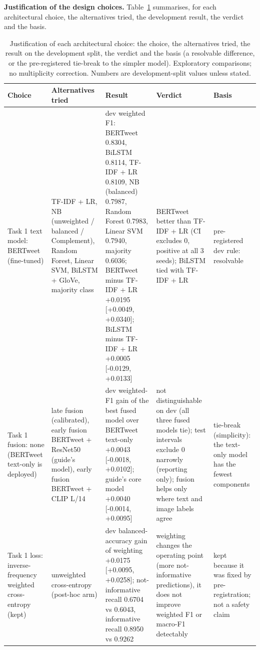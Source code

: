 \documentclass[conference]{IEEEtran}
\begin{document}
\textbf{Justification of the design choices.} Table~\ref{tab:justify} summarises, for each architectural choice, the alternatives tried, the development result, the verdict and the basis.

\begin{table}[t]
\centering
\caption{Justification of each architectural choice: the choice, the alternatives tried, the result on the development split, the verdict and the basis (a resolvable difference, or the pre-registered tie-break to the simpler model). Exploratory comparisons; no multiplicity correction. Numbers are development-split values unless stated.}
\label{tab:justify}
\tiny
\setlength{\tabcolsep}{2.5pt}
\begin{tabular}{p{2.2cm}p{3.1cm}p{5.6cm}p{3.2cm}p{2.6cm}}
\toprule
Choice & Alternatives tried & Result & Verdict & Basis \\
\midrule
Task 1 text model: BERTweet (fine-tuned) & TF-IDF + LR, NB (unweighted / balanced / Complement), Random Forest, Linear SVM, BiLSTM + GloVe, majority class & dev weighted F1: BERTweet 0.8304, BiLSTM 0.8114, TF-IDF + LR 0.8109, NB (balanced) 0.7987, Random Forest 0.7983, Linear SVM 0.7940, majority 0.6036; BERTweet minus TF-IDF + LR +0.0195 [+0.0049, +0.0340]; BiLSTM minus TF-IDF + LR +0.0005 [-0.0129, +0.0133] & BERTweet better than TF-IDF + LR (CI excludes 0, positive at all 3 seeds); BiLSTM tied with TF-IDF + LR & pre-registered dev rule: resolvable \\
\midrule
Task 1 fusion: none (BERTweet text-only is deployed) & late fusion (calibrated), early fusion BERTweet + ResNet50 (guide's model), early fusion BERTweet + CLIP L/14 & dev weighted-F1 gain of the best fused model over BERTweet text-only +0.0043 [-0.0018, +0.0102]; guide's core model +0.0040 [-0.0014, +0.0095] & not distinguishable on dev (all three fused models tie); test intervals exclude 0 narrowly (reporting only); fusion helps only where text and image labels agree & tie-break (simplicity): the text-only model has the fewest components \\
\midrule
Task 1 loss: inverse-frequency weighted cross-entropy (kept) & unweighted cross-entropy (post-hoc arm) & dev balanced-accuracy gain of weighting +0.0175 [+0.0095, +0.0258]; not-informative recall 0.6704 vs 0.6043, informative recall 0.8950 vs 0.9262 & weighting changes the operating point (more not-informative predictions), it does not improve weighted F1 or macro-F1 detectably & kept because it was fixed by pre-registration; not a safety claim \\

\end{tabular}
\end{table}
\end{document}
